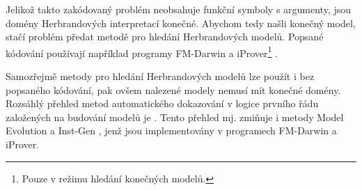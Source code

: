 Jelikož takto zakódovaný problém neobsahuje funkční symboly
s argumenty, jsou domény Herbrandových interpretací konečné.
Abychom tedy našli konečný model, stačí problém předat metodě
pro hledání Herbrandových modelů.
Popsané kódování používají například programy
FM-Darwin \cite{fmdarwin}
a iProver\footnote{Pouze v režimu hledání konečných modelů.} \cite{iprover}.

Samozřejmě metody pro hledání Herbrandových modelů lze použít
i bez popsaného kódování, pak ovšem nalezené modely nemusí
mít konečné domény. Rozsáhlý přehled metod automatického dokazování
v logice prvního řádu za\-lo\-že\-ných na budování
modelů je \cite{bonacina2015}. Tento přehled mj. zmiňuje
i metody Model Evolution \cite{modelevolution}
a Inst-Gen \cite{instgen}, jenž jsou implementovány
v programech FM-Darwin a iProver.

